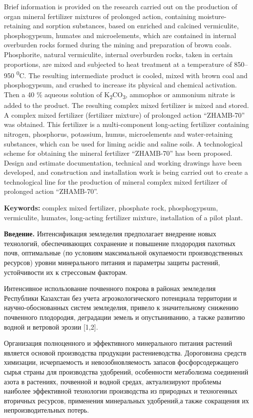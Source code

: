 Brief information is provided on the research carried out on the
production of organ mineral fertilizer mixtures of prolonged action,
containing moisture-retaining and sorption substances, based on enriched
and calcined vermiculite, phosphogypsum, humates and microelements,
which are contained in internal overburden rocks formed during the
mining and preparation of brown coals. Phosphorite, natural vermiculite,
internal overburden rocks, taken in certain proportions, are mixed and
subjected to heat treatment at a temperature of 850--950
\textsuperscript{0}C. The resulting intermediate product is cooled,
mixed with brown coal and phosphogypsum, and crushed to increase its
physical and chemical activation. Then a 40 \% aqueous solution of
K\textsubscript{2}CO\textsubscript{3}, ammophos or ammonium nitrate is
added to the product. The resulting complex mixed fertilizer is mixed
and stored. A complex mixed fertilizer (fertilizer mixture) of prolonged
action ``ZHAMB-70'' was obtained. This fertilizer is a multi-component
long-acting fertilizer containing nitrogen, phosphorus, potassium,
humus, microelements and water-retaining substances, which can be used
for liming acidic and saline soils. A technological scheme for obtaining
the mineral fertilizer ``ZHAMB-70'' has been proposed. Design and
estimate documentation, technical and working drawings have been
developed, and construction and installation work is being carried out
to create a technological line for the production of mineral complex
mixed fertilizer of prolonged action ``ZHAMB-70''.

{\bfseries Keywords:} complex mixed fertilizer, phosphate rock,
phosphogypsum, vermiculite, humates, long-acting fertilizer mixture,
installation of a pilot plant.

{\bfseries Введение.} Интенсификация земледелия предполагает внедрение
новых технологий, обеспечивающих сохранение и повышение плодородия
пахотных почв, оптимальные (по условиям максимальной окупаемости
производственных ресурсов) уровни минерального питания и параметры
защиты растений, устойчивости их к стрессовым факторам.

Интенсивное использование почвенного покрова в районах земледелия
Республики Казахстан без учета агроэкологического потенциала территории
и научно-обоснованных систем земледелия, привело к значительному
снижению почвенного плодородия, деградации земель и опустыниванию, а
также развитию водной и ветровой эрозии {[}1,2{]}.

Организация полноценного и эффективного минерального питания растений
является основой производства продукции растениеводства. Дороговизна
средств химизации, исчерпаемость и невозобновляемость запасов
фосфорсодержащего сырья страны для производства удобрений, особенности
метаболизма соединений азота в растениях, почвенной и водной средах,
актуализируют проблемы наиболее эффективной технологии производства из
природных и техногенных вторичных ресурсов, применения минеральных
удобрений,а также сокращения их непроизводительных потерь.

